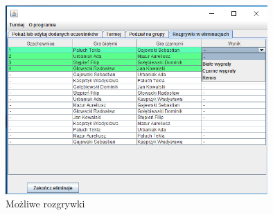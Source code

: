 \begin{figure}[H]
	\centering
	\includegraphics[width=10cm]{fig/12}
	\caption{Możliwe rozgrywki}
	\label {fig:mozliwe_rozgrywki} 
\end{figure}

